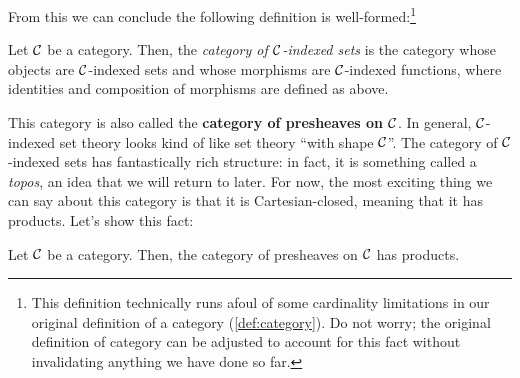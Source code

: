 From this we can conclude the following definition 
is well-formed:\footnote{This definition technically runs afoul of some cardinality 
limitations in our original definition of a category (\cref{def:category}). 
Do not worry; the original definition of category can be adjusted to account 
for this fact without invalidating anything we have done so far.}
\begin{definition}
  \sloppy
  Let $\mathcal C$ be a category. Then, the \emph{category of $\mathcal C$-indexed sets}
  is the category whose objects are $\mathcal C$-indexed 
  sets and whose morphisms are $\mathcal C$-indexed functions, 
  where identities and composition of morphisms are defined as above.
\end{definition}

This category is also called the \textbf{category of presheaves on $\mathcal C$}.  In
general, \(\mathcal C\)-indexed set theory looks kind of like set theory ``with shape
\(\mathcal C\)''.
The category of $\mathcal C$-indexed sets has fantastically rich structure: in fact, 
it is something called a \emph{topos}, an idea that we will return to later. 
For now, the most exciting thing we can say about this category is that it 
is Cartesian-closed, meaning that it has products. 
Let's show this fact:
\begin{theorem}
  Let $\mathcal C$ be a category. Then, the category of presheaves on $\mathcal C$ 
  has products.
\end{theorem}
